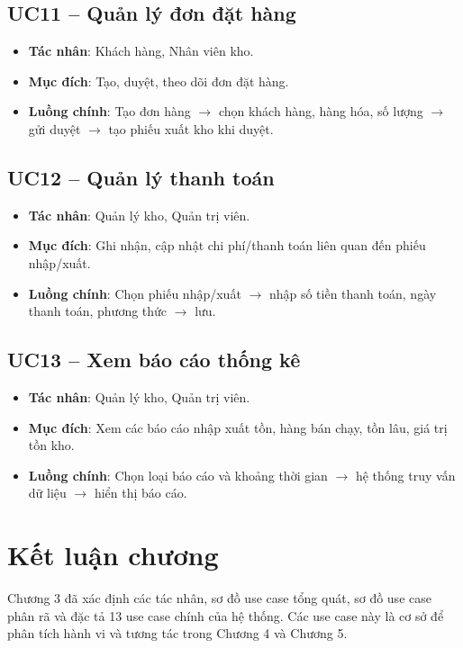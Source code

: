 \subsection{UC11 -- Quản lý đơn đặt hàng}

\begin{itemize}[leftmargin=1.5cm]
    \item \textbf{Tác nhân}: Khách hàng, Nhân viên kho.
    \item \textbf{Mục đích}: Tạo, duyệt, theo dõi đơn đặt hàng.
    \item \textbf{Luồng chính}: Tạo đơn hàng $\rightarrow$ chọn khách hàng, hàng hóa, số lượng $\rightarrow$ gửi duyệt $\rightarrow$ tạo phiếu xuất kho khi duyệt.
\end{itemize}

\subsection{UC12 -- Quản lý thanh toán}

\begin{itemize}[leftmargin=1.5cm]
    \item \textbf{Tác nhân}: Quản lý kho, Quản trị viên.
    \item \textbf{Mục đích}: Ghi nhận, cập nhật chi phí/thanh toán liên quan đến phiếu nhập/xuất.
    \item \textbf{Luồng chính}: Chọn phiếu nhập/xuất $\rightarrow$ nhập số tiền thanh toán, ngày thanh toán, phương thức $\rightarrow$ lưu.
\end{itemize}

\subsection{UC13 -- Xem báo cáo thống kê}

\begin{itemize}[leftmargin=1.5cm]
    \item \textbf{Tác nhân}: Quản lý kho, Quản trị viên.
    \item \textbf{Mục đích}: Xem các báo cáo nhập xuất tồn, hàng bán chạy, tồn lâu, giá trị tồn kho.
    \item \textbf{Luồng chính}: Chọn loại báo cáo và khoảng thời gian $\rightarrow$ hệ thống truy vấn dữ liệu $\rightarrow$ hiển thị báo cáo.
\end{itemize}

\section{Kết luận chương}

Chương 3 đã xác định các tác nhân, sơ đồ use case tổng quát, sơ đồ use case phân rã và đặc tả 13 use case chính của hệ thống. Các use case này là cơ sở để phân tích hành vi và tương tác trong Chương 4 và Chương 5.
